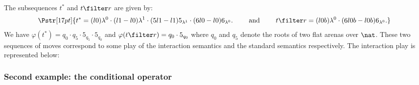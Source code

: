 The subsequences $t^*$ and $t \filter r$ are given by:
$$
\Pstr[17pt]{ t^* = (l0){\lambda^0} \cdot (l1-l0){\lambda^1} \cdot
(5l1-l1){5_{\lambda^1}} \cdot (6l0-l0){6_{\lambda^0}}.
\qquad  \mbox{ and } \qquad t
\filter r = (l0b){\lambda^0} \cdot
(6l0b-l0b){6_{\lambda^0}}. }
$$
We have $\varphi(t^*) = q_0 \cdot q_5 \cdot 5_{q_5} \cdot 5_{q_0}$
and $\varphi(t\filter r) = q_0 \cdot 5_{q_0}$ where $q_0$
and $q_5$ denote the roots of two flat arenas over $\nat$. These two
sequences of moves correspond to some play of the interaction
semantics and the standard semantics respectively. The interaction
play is represented below:
\begin{center}
\end{center}

\subsubsection{Second example: the conditional operator}

